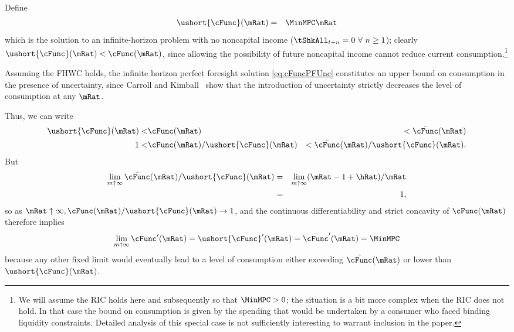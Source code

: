 \documentclass[titlepage]{\econtex}\providecommand{\texname}{BufferStockTheory}%
\begin{document}
{\label{subsec:LimitsAsmtToInfty}

Define
\begin{eqnarray}
   \ushort{\cFunc}(\mRat) & = & \MinMPC \mRat \nonumber
\end{eqnarray}
which is the solution to an infinite-horizon problem with no noncapital
income
($\tShkAll_{t+n} = 0~\forall~n\geq1$); 
  clearly $\ushort{\cFunc}(\mRat)
< \cFunc(\mRat)$, since allowing the possibility of future noncapital
income cannot reduce current consumption.\footnote{We will assume the
  RIC holds here and subsequently so that $\MinMPC > 0$; the situation
  is a bit more complex when the RIC does not hold.   In that case the bound on consumption is given by the spending
  that would be undertaken by a consumer who faced binding liquidity
  constraints.  Detailed analysis of this special case is not
  sufficiently interesting to warrant inclusion in the paper.}

Assuming the FHWC holds, the infinite horizon perfect
foresight solution \eqref{eq:cFuncPFUnc} constitutes an upper
bound on consumption in the presence of uncertainty, since Carroll and
Kimball~\citeyearpar{ckConcavity} show that the introduction of
uncertainty strictly decreases the level of consumption at any $\mRat$.

Thus, we can write
\begin{eqnarray}  \label{eq:lowerltupper}
\ushort{\cFunc}(\mRat) < & \cFunc(\mRat) & < \bar{\cFunc}(\mRat) \nonumber \\
1 < & \cFunc(\mRat)/\ushort{\cFunc}(\mRat) & < \bar{\cFunc}(\mRat)/\ushort{\cFunc}(\mRat). \nonumber
\end{eqnarray}
But
\begin{eqnarray}  \label{eq:limitlowerupper}
\lim_{m \uparrow \infty} \bar{\cFunc}(\mRat)/\ushort{\cFunc}(\mRat) & = &
\lim_{m \uparrow \infty} (\mRat -1+ \hRat)/\mRat \nonumber \\
& = & 1, \nonumber
\end{eqnarray}
so as $\mRat \uparrow \infty, \cFunc(\mRat)/\ushort{\cFunc}(\mRat)
\rightarrow 1$, and the continuous differentiability and strict
concavity of $\cFunc(\mRat)$ therefore implies
\begin{equation}  \label{eq:limxtoinftycp}
\lim_{m \uparrow \infty} \cFunc^{\prime}(\mRat) =
\ushort{\cFunc}^{\prime}(\mRat) = \bar{\cFunc}^{\prime}(\mRat) = \MinMPC \notag
\end{equation}
because any other fixed limit would eventually lead to a level of
consumption either exceeding $\bar{\cFunc}(\mRat)$ or lower than
$\ushort{\cFunc}(\mRat)$.

}
\end{document}
